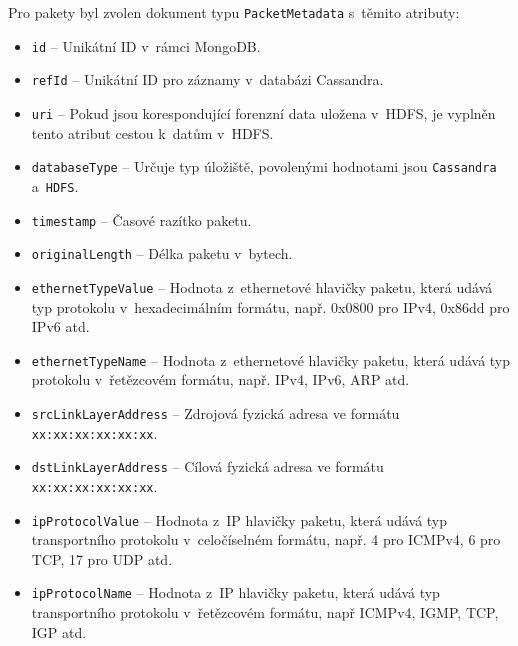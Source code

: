 \vspace{0.5cm}
\noindent Pro pakety byl zvolen dokument typu \texttt{PacketMetadata} s~těmito atributy:

\begin{itemize}
    \item \texttt{id} -- Unikátní ID v~rámci MongoDB.
    
    \item \texttt{refId} -- Unikátní ID pro záznamy v~databázi Cassandra.
    
    \item \texttt{uri} -- Pokud jsou korespondující forenzní data uložena v~HDFS, je vyplněn tento atribut cestou k~datům v~HDFS.
    
    \item \texttt{databaseType} -- Určuje typ úložiště, povolenými hodnotami jsou \texttt{Cassandra} a~\texttt{HDFS}.
    
    \item \texttt{timestamp} -- Časové razítko paketu.
    
    \item \texttt{originalLength} -- Délka paketu v~bytech.
    
    \item \texttt{ethernetTypeValue} -- Hodnota z~ethernetové hlavičky paketu, která udává typ protokolu v~hexadecimálním formátu, např. 0x0800 pro IPv4, 0x86dd pro IPv6 atd.
    
    \item \texttt{ethernetTypeName} -- Hodnota z~ethernetové hlavičky paketu, která udává typ protokolu v~řetězcovém formátu, např. IPv4, IPv6, ARP atd.
    
    \item \texttt{srcLinkLayerAddress} -- Zdrojová fyzická adresa ve formátu \texttt{xx:xx:xx:xx:xx:xx}.
    
    \item \texttt{dstLinkLayerAddress} -- Cílová fyzická adresa ve formátu \texttt{xx:xx:xx:xx:xx:xx}.
    
    \item \texttt{ipProtocolValue} -- Hodnota z~IP hlavičky paketu, která udává typ transportního protokolu v~celočíselném formátu, např. 4 pro ICMPv4, 6 pro TCP, 17 pro UDP atd.
    
    \item \texttt{ipProtocolName} -- Hodnota z~IP hlavičky paketu, která udává typ transportního protokolu v~řetězcovém formátu, např ICMPv4, IGMP, TCP, IGP atd.
    

\end{itemize}
